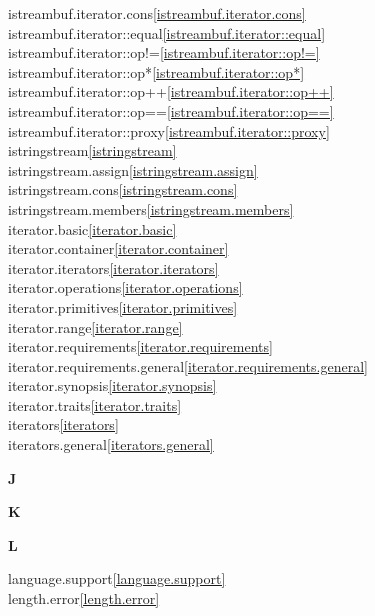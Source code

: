 \begin{multicols}{2}
istreambuf.iterator.cons\quad\ref{istreambuf.iterator.cons}\\
istreambuf.iterator::equal\quad\ref{istreambuf.iterator::equal}\\
istreambuf.iterator::op!=\quad\ref{istreambuf.iterator::op!=}\\
istreambuf.iterator::op*\quad\ref{istreambuf.iterator::op*}\\
istreambuf.iterator::op++\quad\ref{istreambuf.iterator::op++}\\
istreambuf.iterator::op==\quad\ref{istreambuf.iterator::op==}\\
istreambuf.iterator::proxy\quad\ref{istreambuf.iterator::proxy}\\
istringstream\quad\ref{istringstream}\\
istringstream.assign\quad\ref{istringstream.assign}\\
istringstream.cons\quad\ref{istringstream.cons}\\
istringstream.members\quad\ref{istringstream.members}\\
iterator.basic\quad\ref{iterator.basic}\\
iterator.container\quad\ref{iterator.container}\\
iterator.iterators\quad\ref{iterator.iterators}\\
iterator.operations\quad\ref{iterator.operations}\\
iterator.primitives\quad\ref{iterator.primitives}\\
iterator.range\quad\ref{iterator.range}\\
iterator.requirements\quad\ref{iterator.requirements}\\
iterator.requirements.general\quad\ref{iterator.requirements.general}\\
iterator.synopsis\quad\ref{iterator.synopsis}\\
iterator.traits\quad\ref{iterator.traits}\\
iterators\quad\ref{iterators}\\
iterators.general\quad\ref{iterators.general}\\
\par \textbf{J}\par
\par \textbf{K}\par
\par \textbf{L}\par
language.support\quad\ref{language.support}\\
length.error\quad\ref{length.error}\\

\end{multicols}
